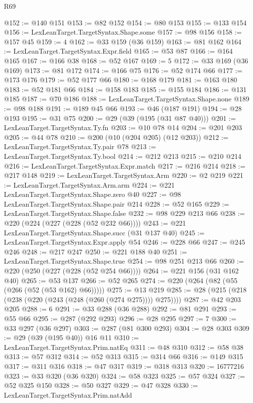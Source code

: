 \begin{lexlean}{R69}
\begin{coremodule}
@152 := @140 @151
@153 := @82 @152
@154 := @80 @153
@155 := @133 @154
@156 := LexLeanTarget.TargetSyntax.Shape.some
@157 := @98 @156
@158 := @157 @45
@159 := 4
@162 := @33 @159 (@36 @159)
@163 := @81 @162
@164 := LexLeanTarget.TargetSyntax.Expr.field
@165 := @53 @87
@166 := @164 @165
@167 := @166 @38
@168 := @52 @167
@169 := 5
@172 := @33 @169 (@36 @169)
@173 := @81 @172
@174 := @166 @75
@176 := @52 @174 @66
@177 := @173 @176
@179 := @52 @177 @66
@180 := @168 @179
@181 := @163 @180
@183 := @52 @181 @66
@184 := @158 @183
@185 := @155 @184
@186 := @131 @185
@187 := @70 @186
@188 := LexLeanTarget.TargetSyntax.Shape.none
@189 := @98 @188
@191 := @189 @45 @66
@193 := @46 (@187 @191)
@194 := @28 @193
@195 := @31 @75
@200 := @29 (@39 (@195 (@31 @87 @40)))
@201 := LexLeanTarget.TargetSyntax.Ty.fn
@203 := @10 @78 @14
@204 := @201 @203
@205 := @44 @78
@210 := @200 (@10 (@204 @205) (@12 @203))
@212 := LexLeanTarget.TargetSyntax.Ty.pair @78
@213 := LexLeanTarget.TargetSyntax.Ty.bool
@214 := @212 @213
@215 := @210 @214
@216 := LexLeanTarget.TargetSyntax.Expr.match
@217 := @216 @214
@218 := @217 @148
@219 := LexLeanTarget.TargetSyntax.Arm
@220 := @2 @219
@221 := LexLeanTarget.TargetSyntax.Arm.arm
@224 := @221 LexLeanTarget.TargetSyntax.Shape.zero @40
@227 := @98 LexLeanTarget.TargetSyntax.Shape.pair @214
@228 := @52 @165
@229 := LexLeanTarget.TargetSyntax.Shape.false
@232 := @98 @229 @213 @66
@238 := @220 (@224 (@227 (@228 (@52 @232 @66))))
@243 := @221 LexLeanTarget.TargetSyntax.Shape.succ (@31 @137 @40)
@245 := LexLeanTarget.TargetSyntax.Expr.apply @54
@246 := @228 @66
@247 := @245 @246
@248 := @217 @247
@250 := @221 @188 @40
@251 := LexLeanTarget.TargetSyntax.Shape.true
@254 := @98 @251 @213 @66
@260 := @220 (@250 (@227 (@228 (@52 @254 @66))))
@264 := @221 @156 (@31 @162 @40)
@265 := @53 @137
@266 := @52 @265
@274 := @220 (@264 (@82 (@55 (@266 (@52 (@53 @162) @66)))))
@275 := @13 @219
@285 := @28 (@215 (@218 (@238 (@220 (@243 (@248 (@260 (@274 @275)))) @275))))
@287 := @42 @203 @205
@288 := 6
@291 := @33 @288 (@36 @288)
@292 := @81 @291
@293 := @55 @66
@295 := @287 (@292 @293)
@296 := @28 @295
@297 := 7
@300 := @33 @297 (@36 @297)
@303 := @287 (@81 @300 @293)
@304 := @28 @303
@309 := @29 (@39 (@195 @40)) @16 @11
@310 := LexLeanTarget.TargetSyntax.Prim.natEq
@311 := @48 @310
@312 := @58 @38
@313 := @57 @312
@314 := @52 @313
@315 := @314 @66
@316 := @149 @315
@317 := @311 @316
@318 := @47 @317
@319 := @318 @313
@320 := 16777216
@323 := @33 @320 (@36 @320)
@324 := @58 @323
@325 := @57 @324
@327 := @52 @325 @150
@328 := @50 @327
@329 := @47 @328
@330 := LexLeanTarget.TargetSyntax.Prim.natAdd

\end{coremodule}
\end{lexlean}
